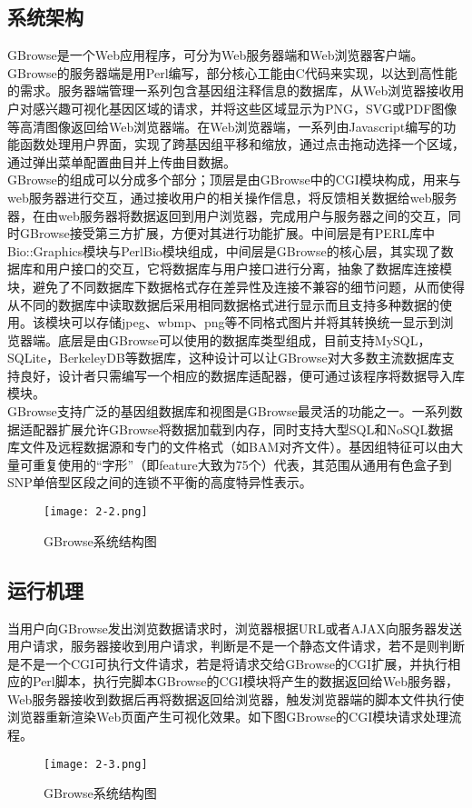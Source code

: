 		\subsection{系统架构}
		GBrowse是一个Web应用程序，可分为Web服务器端和Web浏览器客户端。GBrowse的服务器端是用Perl编写，部分核心工能由C代码来实现，以达到高性能的需求。服务器端管理一系列包含基因组注释信息的数据库，从Web浏览器接收用户对感兴趣可视化基因区域的请求，并将这些区域显示为PNG，SVG或PDF图像等高清图像返回给Web浏览器端。在Web浏览器端，一系列由Javascript编写的功能函数处理用户界面，实现了跨基因组平移和缩放，通过点击拖动选择一个区域，通过弹出菜单配置曲目并上传曲目数据。\\
		\indent GBrowse的组成可以分成多个部分；顶层是由GBrowse中的CGI模块构成，用来与web服务器进行交互，通过接收用户的相关操作信息，将反馈相关数据给web服务器，在由web服务器将数据返回到用户浏览器，完成用户与服务器之间的交互，同时GBrowse接受第三方扩展，方便对其进行功能扩展。中间层是有PERL库中Bio::Graphics模块与PerlBio模块组成，中间层是GBrowse的核心层，其实现了数据库和用户接口的交互，它将数据库与用户接口进行分离，抽象了数据库连接模块，避免了不同数据库下数据格式存在差异性及连接不兼容的细节问题，从而使得从不同的数据库中读取数据后采用相同数据格式进行显示而且支持多种数据的使用。该模块可以存储jpeg、wbmp、png等不同格式图片并将其转换统一显示到浏览器端。底层是由GBrowse可以使用的数据库类型组成，目前支持MySQL，SQLite，BerkeleyDB等数据库，这种设计可以让GBrowse对大多数主流数据库支持良好，设计者只需编写一个相应的数据库适配器，便可通过该程序将数据导入库模块。\\
		\indent GBrowse支持广泛的基因组数据库和视图是GBrowse最灵活的功能之一。一系列数据适配器扩展允许GBrowse将数据加载到内存，同时支持大型SQL和NoSQL数据库文件及远程数据源和专门的文件格式（如BAM对齐文件）。基因组特征可以由大量可重复使用的“字形”（即feature大致为75个）代表，其范围从通用有色盒子到SNP单倍型区段之间的连锁不平衡的高度特异性表示。
		\begin{figure}[!ht]
			\centering
			\texttt{[image: 2-2.png]}
			\caption{GBrowse系统结构图}
		\end{figure}
		\subsection{运行机理}
		当用户向GBrowse发出浏览数据请求时，浏览器根据URL或者AJAX向服务器发送用户请求，服务器接收到用户请求，判断是不是一个静态文件请求，若不是则判断是不是一个CGI可执行文件请求，若是将请求交给GBrowse的CGI扩展，并执行相应的Perl脚本，执行完脚本GBrowse的CGI模块将产生的数据返回给Web服务器，Web服务器接收到数据后再将数据返回给浏览器，触发浏览器端的脚本文件执行使浏览器重新渲染Web页面产生可视化效果。如下图GBrowse的CGI模块请求处理流程。
			\begin{figure}[!ht]
				\centering
				\texttt{[image: 2-3.png]}
				\caption{GBrowse系统结构图}
			\end{figure}
